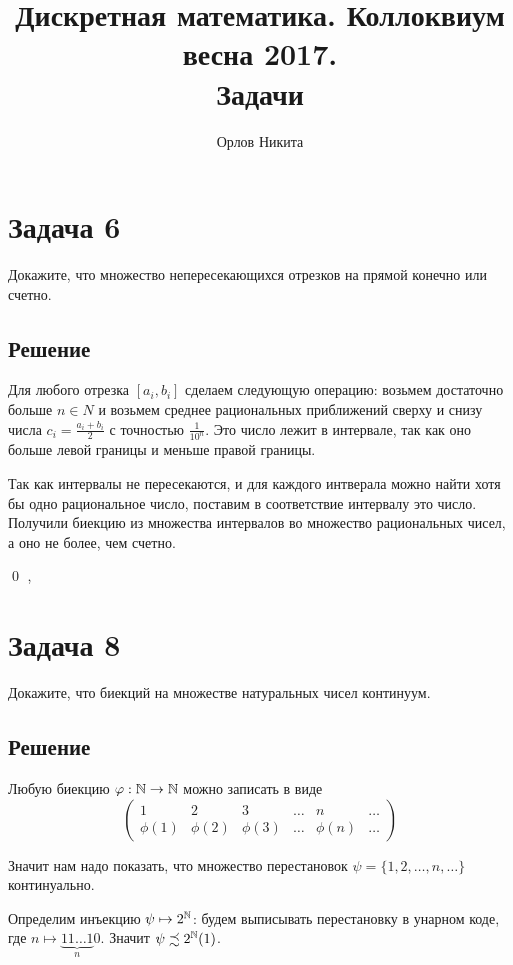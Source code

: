 \documentclass[a4paper,12pt]{article}
\begin{document}
	\title{Дискретная математика. Коллоквиум весна 2017. \\ Задачи}
	\author{Орлов Никита}
	\maketitle
	
	\section*{Задача 6}
	Докажите, что множество непересекающихся отрезков на прямой конечно или счетно.
	\subsection*{Решение}
	Для любого отрезка $[a_i, b_i]$ сделаем следующую операцию: возьмем достаточно больше $n \in N$ и возьмем среднее рациональных приближений сверху и снизу числа $c_i = \frac{a_i + b_i}{2}$ с точностью $\frac{1}{10^n}$. Это число лежит в интервале, так как оно больше левой границы и меньше правой границы.
	
	Так как интервалы не пересекаются, и для каждого интверала можно найти хотя бы одно рациональное число, поставим в соответствие интервалу это число. Получили биекцию из множества интервалов во множество рациональных чисел, а оно не более, чем счетно.
	
	\qed
	\sep	
	
	
	\section*{Задача 8}
	Докажите, что биекций на множестве натуральных чисел континуум.
	
	\subsection*{Решение}
	Любую биекцию $\varphi: \mathbb{N} \rightarrow \mathbb{N}$ можно записать в виде
	\[
	\begin{pmatrix}
	1 & 2 & 3 & \ldots & n & \ldots \\
	\phi(1) & \phi(2) & \phi(3) & \ldots & \phi(n) & \ldots 
	\end{pmatrix}
	\]
	
	Значит нам надо показать, что множество перестановок $\psi = \{1, 2, \ldots, n, \ldots \}$ континуально. 
	
	Определим инъекцию $\psi \mapsto 2^{\mathbb{N}}$: будем выписывать перестановку в унарном коде, где $n \mapsto \underbrace{11\ldots1}_n0$. Значит $\label{eq:1} \psi \precsim 2^{\mathbb{N}} (1)$.
	
\end{document}
